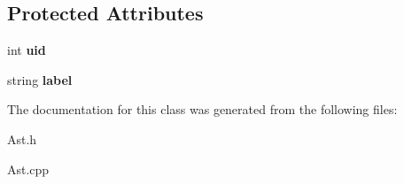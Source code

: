 \subsection*{Protected Attributes}
\begin{DoxyCompactItemize}
\item 
\hypertarget{classAST_a847b778f1c3dd5a19de32de432ee6e15}{int {\bfseries uid}}\label{classAST_a847b778f1c3dd5a19de32de432ee6e15}

\item 
\hypertarget{classAST_ab2e239ccc0688d2341724432ff5a1a31}{string {\bfseries label}}\label{classAST_ab2e239ccc0688d2341724432ff5a1a31}

\end{DoxyCompactItemize}


The documentation for this class was generated from the following files\-:\begin{DoxyCompactItemize}
\item 
Ast.\-h\item 
Ast.\-cpp\end{DoxyCompactItemize}
